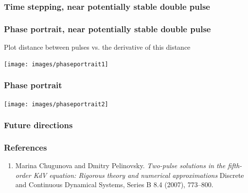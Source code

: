 \documentclass[16pt]{beamer}
\begin{document}
\begin{frame}
	\frametitle{Time stepping, near potentially stable double pulse}
	\fontsize{16}{7.2}\selectfont
	\begin{center}
	\end{center}
\end{frame}

\begin{frame}
	\frametitle{Phase portrait, near potentially stable double pulse}
	\fontsize{16}{7.2}\selectfont
	Plot distance between pulses vs. the derivative of this distance
	\begin{center}
	\texttt{[image: images/phaseportrait1]}
	\end{center}
\end{frame}

\begin{frame}
	\frametitle{Phase portrait}
	\fontsize{16}{7.2}\selectfont
	\begin{center}
	\texttt{[image: images/phaseportrait2]}
	\end{center}
\end{frame}

\begin{frame}
	\frametitle{Future directions}
	\fontsize{16}{7.2}\selectfont

\end{frame}

\begin{frame}
	\frametitle{References}
	\begin{enumerate}
	\item Marina Chugunova and Dmitry Pelinovsky. \emph{Two-pulse solutions in the fifth-order KdV equation: Rigorous theory and numerical approximations} Discrete and Continuous Dynamical Systems, Series B 8.4 (2007), 773–800.
	\end{enumerate}
\end{frame}
 
\end{document}
